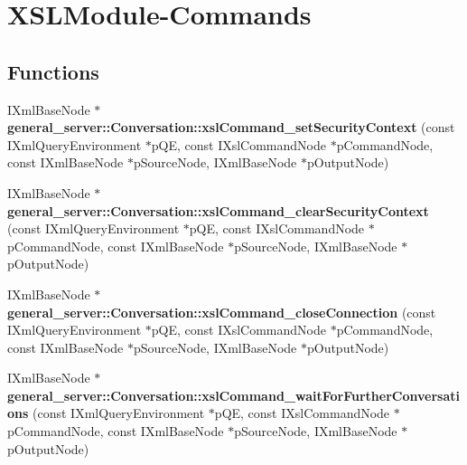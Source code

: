 \hypertarget{group__XSLModule-Commands}{\section{\-X\-S\-L\-Module-\/\-Commands}
\label{group__XSLModule-Commands}
}
\subsection*{\-Functions}
\begin{DoxyCompactItemize}
\item 
\hypertarget{group__XSLModule-Commands_gac31e7d301c3d86dce0e55b79fbad1720}{\-I\-Xml\-Base\-Node $\ast$ {\bfseries general\-\_\-server\-::\-Conversation\-::xsl\-Command\-\_\-set\-Security\-Context} (const \-I\-Xml\-Query\-Environment $\ast$p\-Q\-E, const \-I\-Xsl\-Command\-Node $\ast$p\-Command\-Node, const \-I\-Xml\-Base\-Node $\ast$p\-Source\-Node, \-I\-Xml\-Base\-Node $\ast$p\-Output\-Node)}\label{group__XSLModule-Commands_gac31e7d301c3d86dce0e55b79fbad1720}

\item 
\hypertarget{group__XSLModule-Commands_gadd48d969a11a313bd97694f245e9b4da}{\-I\-Xml\-Base\-Node $\ast$ {\bfseries general\-\_\-server\-::\-Conversation\-::xsl\-Command\-\_\-clear\-Security\-Context} (const \-I\-Xml\-Query\-Environment $\ast$p\-Q\-E, const \-I\-Xsl\-Command\-Node $\ast$p\-Command\-Node, const \-I\-Xml\-Base\-Node $\ast$p\-Source\-Node, \-I\-Xml\-Base\-Node $\ast$p\-Output\-Node)}\label{group__XSLModule-Commands_gadd48d969a11a313bd97694f245e9b4da}

\item 
\hypertarget{group__XSLModule-Commands_ga05c29c86a1739327f3771ec1a980e4e0}{\-I\-Xml\-Base\-Node $\ast$ {\bfseries general\-\_\-server\-::\-Conversation\-::xsl\-Command\-\_\-close\-Connection} (const \-I\-Xml\-Query\-Environment $\ast$p\-Q\-E, const \-I\-Xsl\-Command\-Node $\ast$p\-Command\-Node, const \-I\-Xml\-Base\-Node $\ast$p\-Source\-Node, \-I\-Xml\-Base\-Node $\ast$p\-Output\-Node)}\label{group__XSLModule-Commands_ga05c29c86a1739327f3771ec1a980e4e0}

\item 
\hypertarget{group__XSLModule-Commands_ga9d22734fc0fa84a55ed1f8d081679e89}{\-I\-Xml\-Base\-Node $\ast$ {\bfseries general\-\_\-server\-::\-Conversation\-::xsl\-Command\-\_\-wait\-For\-Further\-Conversations} (const \-I\-Xml\-Query\-Environment $\ast$p\-Q\-E, const \-I\-Xsl\-Command\-Node $\ast$p\-Command\-Node, const \-I\-Xml\-Base\-Node $\ast$p\-Source\-Node, \-I\-Xml\-Base\-Node $\ast$p\-Output\-Node)}\label{group__XSLModule-Commands_ga9d22734fc0fa84a55ed1f8d081679e89}


\end{DoxyCompactItemize}
